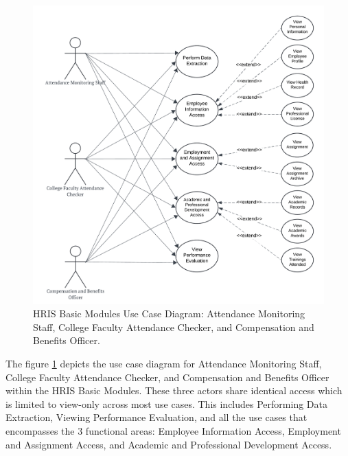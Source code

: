     \begin{figure}[H]
        \centering
        \includegraphics[width=0.9\linewidth]{figures/images/use-case-basic-2.png}
        \caption{HRIS Basic Modules Use Case Diagram: Attendance Monitoring Staff, College Faculty Attendance Checker, and Compensation and Benefits Officer.}
        \label{fig:use-case-basic-2}
    \end{figure}

    The figure \ref{fig:use-case-basic-2} depicts the use case diagram for Attendance Monitoring Staff, College Faculty Attendance Checker, and Compensation and Benefits Officer within the HRIS Basic Modules. These three actors share identical access which is limited to view-only across most use cases. This includes Performing Data Extraction, Viewing Performance Evaluation, and all the use cases that encompasses the 3 functional areas: Employee Information Access, Employment and Assignment Access, and Academic and Professional Development Access. 

